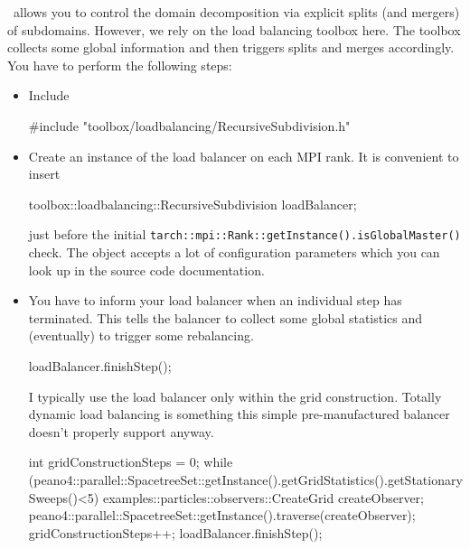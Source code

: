 \Peano\ allows you to control the domain decomposition via explicit splits (and
mergers) of subdomains.
However, we rely on the load balancing toolbox here.
The toolbox collects some global information and then triggers splits and merges
accordingly.
You have to perform the following steps:
\begin{itemize}
  \item Include 
\begin{code}
#include "toolbox/loadbalancing/RecursiveSubdivision.h"
\end{code}
  \item Create an instance of the load balancer on each MPI rank. It is
  convenient to insert
\begin{code}
toolbox::loadbalancing::RecursiveSubdivision  loadBalancer;
\end{code}
  just before the initial
  \texttt{tarch::mpi::Rank::getInstance().isGlobalMaster()} check. The object
  accepts a lot of configuration parameters which you can look up in the source
  code documentation.
  \item You have to inform your load balancer when an individual step has
  terminated. This tells the balancer to collect some global statistics and
  (eventually) to trigger some rebalancing.
\begin{code}
loadBalancer.finishStep();
\end{code}
  I typically use the load balancer only within the grid construction. Totally
  dynamic load balancing is something this simple pre-manufactured balancer
  doesn't properly support anyway.
\begin{code}
int gridConstructionSteps = 0;
while (peano4::parallel::SpacetreeSet::getInstance().getGridStatistics().getStationarySweeps()<5) {
  examples::particles::observers::CreateGrid createObserver;
  peano4::parallel::SpacetreeSet::getInstance().traverse(createObserver);
  gridConstructionSteps++;
  loadBalancer.finishStep();
}
\end{code}
\end{itemize}



